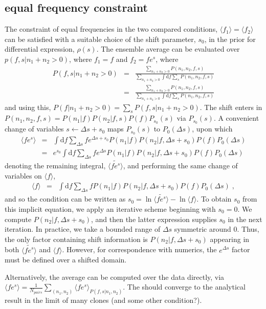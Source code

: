 \documentclass[letterpaper,english,prl,reprint,longbibliography]{revtex4-1} %
\begin{document}
\subsection*{equal frequency constraint}
The constraint of equal frequencies in the two compared conditions, $\langle f_1\rangle=\langle f_2\rangle$ can be satisfied with a suitable choice of the shift parameter, $s_0$, in the prior for differential expression, $\rho(s)$. The ensemble average can be evaluated over $p(f,s|n_1+n_2>0)$, where $f_1=f$ and $f_2=f e^s$, where 
\begin{align}
	P(f,s|n_1+n_2>0)&=&\frac{\sum_{n_1+n_2>0}{P(n_1,n_2,f,s)}}{\sum_{n_1+n_2>0}\int{\textrm{d}f \sum_s P(n_1,n_2,f,s)}} \\
					&=&\frac{\sum_{n_1+n_2>0}{P(n_1,n_2,f,s)}}{\sum_{n_1+n_2>0}\int{\textrm{d}f \sum_s P(n_1,n_2,f,s)}}
\end{align}
and using this, $P(f|n_1+n_2>0)=\sum_s P(f,s|n_1+n_2>0)$. The shift enters in $P(n_1,n_2,f,s)=P(n_1|f)P(n_2|f,s)P(f)P_{s_0}(s)$ via $P_{s_0}(s)$. A convenient change of variables $s\leftarrow\Delta s+s_0$ maps $P_{s_0}(s)$ to $P_{0}(\Delta s)$, upon which
\begin{align}
	\langle fe^s \rangle &=&\int{ \textrm{d}f \sum_{\Delta s} fe^{\Delta s+s_0} P(n_1|f)P(n_2|f,\Delta s+s_0)P(f)P_{0}(\Delta s)} \\
						 &=&e^{s_0}\int{ \textrm{d}f \sum_{\Delta s} fe^{\Delta s} P(n_1|f)P(n_2|f,\Delta s+s_0)P(f)P_{0}(\Delta s)}
\end{align}
denoting the remaining integral, $\tilde{\langle fe^s \rangle}$, and performing the same change of variables on $\langle f \rangle$,
\begin{align}
	\langle f \rangle &=&\int{ \textrm{d}f \sum_{\Delta s} f             P(n_1|f)P(n_2|f,\Delta s+s_0)P(f)P_{0}(\Delta s)}\;,
\end{align}
and so the condition can be written as $s_0=\ln \tilde{\langle fe^s \rangle} - \ln \langle f \rangle$. To obtain $s_0$ from this implicit equation, we apply an iterative scheme beginning with $s_0=0$. We compute $P(n_2|f,\Delta s+s_0)$, and then the latter expression supplies $s_0$ in the next iteration. In practice, we take a bounded range of $\Delta s$ symmetric around 0. Thus, the only factor containing shift information is $P(n_2|f,\Delta s+s_0)$ appearing in both $\tilde{\langle fe^s \rangle}$ and $\langle f \rangle$. However, for correspondence with numerics, the $e^{\Delta s}$ factor must be defined over a shifted domain.

Alternatively, the average can be computed over the data directly, via $\langle fe^s \rangle=\frac{1}{N_{pairs}}\sum_{(n_1,n_2)}\langle fe^s \rangle_{P(f,s|n_1,n_2)}$. The should converge to the analytical result in the limit of many clones (and some other condition?).
\end{document}
